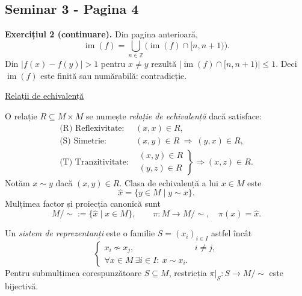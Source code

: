 
\subsection*{Seminar 3 - Pagina 4}
\begingroup
\setlength{\abovedisplayskip}{5pt}
\setlength{\belowdisplayskip}{5pt}
\setlength{\abovedisplayshortskip}{3pt}
\setlength{\belowdisplayshortskip}{3pt}

\noindent\textbf{Exercițiul 2 (continuare).} Din pagina anterioară,
\[
 \operatorname{im}(f)=\bigcup_{n\in\mathbb Z}
 \bigl(\operatorname{im}(f)\cap[n,n+1)\bigr).
\]
Din $|f(x)-f(y)|>1$ pentru $x\neq y$ rezultă
$|\operatorname{im}(f)\cap[n,n+1)|\leq1$.
Deci $\operatorname{im}(f)$ este finită sau numărabilă: contradicție.

\medskip
\noindent\underline{Relații de echivalență}

\noindent O relație $R\subseteq M\times M$ se numește
\emph{relație de echivalență} dacă satisface:
\[
\begin{array}{ll}
 \text{(R) Reflexivitate:}&(x,x)\in R,\\[2pt]
 \text{(S) Simetrie:}&(x,y)\in R\ \Longrightarrow\ (y,x)\in R,\\[2pt]
 \text{(T) Tranzitivitate:}&
  \left.\begin{array}{l}(x,y)\in R\\(y,z)\in R\end{array}\right\}
  \Longrightarrow (x,z)\in R.
\end{array}
\]
Notăm $x\sim y$ dacă $(x,y)\in R$. Clasa de echivalență a
lui $x\in M$ este
\[
 \widehat{x}=\{y\in M\mid y\sim x\}.
\]
Mulțimea factor și proiecția canonică sunt
\[
 M/{\sim}:=\{\widehat{x}\mid x\in M\},
 \qquad
 \pi:M\longrightarrow M/{\sim},
 \quad \pi(x)=\widehat{x}.
\]

\noindent Un \emph{sistem de reprezentanți} este o familie
$S=(x_i)_{i\in I}$ astfel încât
\[
 \begin{cases}
   x_i\not\sim x_j,&i\neq j,\\[2pt]
   \forall x\in M\ \exists i\in I:\ x\sim x_i.
 \end{cases}
\]
Pentru submulțimea corespunzătoare $S\subseteq M$, restricția
$\pi|_S:S\to M/{\sim}$ este bijectivă.

